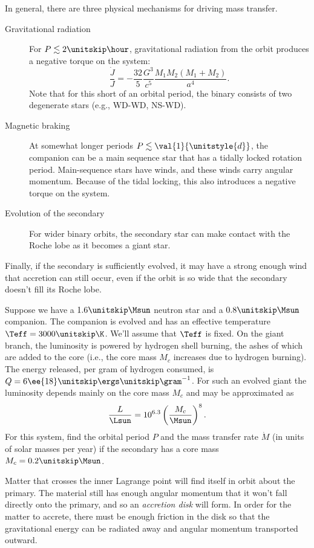 In general, there are three physical mechanisms for driving mass transfer.
\begin{description}
\item[Gravitational radiation] For $P \lesssim 2\nsp\hour$, gravitational radiation from the orbit produces a negative torque on the system:
\begin{equation}\label{e.GR-torque}
\frac{\dot{J}}{J} = -\frac{32}{5}\frac{G^{3}}{c^{5}}\frac{M_{1}M_{2}(M_{1}+M_{2})}{a^{4}}.
\end{equation}
Note that for this short of an orbital period, the binary consists of two degenerate stars (e.g., WD-WD, NS-WD).
\item[Magnetic braking] At somewhat longer periods $P \lesssim \val{1}{\unitstyle{d}}$, the companion can be a main sequence star that has a tidally locked rotation period.  Main-sequence stars have winds, and these winds carry angular momentum.  Because of the tidal locking, this also introduces a negative torque on the system.
\item[Evolution of the secondary] For wider binary orbits, the secondary star can make contact with the Roche lobe as it becomes a giant star.
\end{description}
Finally, if the secondary is sufficiently evolved, it may have a strong enough wind that accretion can still occur, even if the orbit is so wide that the secondary doesn't fill its Roche lobe.


\begin{exercisebox}
Suppose we have a $1.6\nsp\Msun$ neutron star and a $0.8\nsp\Msun$ companion.  The companion is evolved and has an effective temperature $\Teff = 3000\nsp\K$.  We'll assume that $\Teff$ is fixed.  On the giant branch, the luminosity is powered by hydrogen shell burning, the ashes of which are added to the core (i.e., the core mass $M_{c}$ increases due to hydrogen burning).  The energy released, per gram of hydrogen consumed, is $Q = 6\ee{18}\nsp\ergs\usp\gram^{-1}$. For such an evolved giant the luminosity depends mainly on the core mass $M_{c}$ and may be approximated as \citep{Ritter1999Analytical-solu}
\[
	\frac{L}{\Lsun} = 10^{6.3}\left(\frac{M_{c}}{\Msun}\right)^{8}.
\]
For this system, find the orbital period $P$ and the mass transfer rate $\dot{M}$ (in units of solar masses per year) if the secondary has a core mass $M_{c} = 0.2\nsp\Msun$. 
\end{exercisebox}

Matter that crosses the inner Lagrange point will find itself in orbit about the primary.  The material still has enough angular momentum that it won't fall directly onto the primary, and so an \emph{accretion disk} will form. In order for the matter to accrete, there must be enough friction in the disk so that the gravitational energy can be radiated away and angular momentum transported outward.

